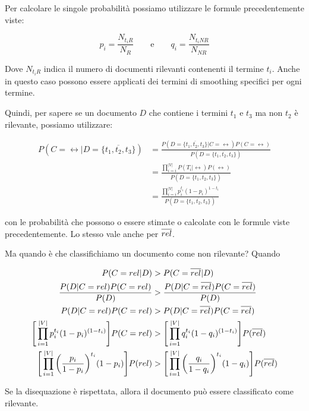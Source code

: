 \noindent Per calcolare le singole probabilità possiamo utilizzare le formule precedentemente viste:

$$
\boxed{p_i = \frac{N_{t_iR}}{N_R}} \qquad \text{e} \qquad \boxed{q_i = \frac{N_{t_iNR}}{N_{NR}}}
$$

\noindent Dove $N_{t_iR}$ indica il numero di documenti rilevanti contenenti il termine $t_i$. Anche in questo caso possono essere applicati dei termini di smoothing specifici per ogni termine.

Quindi, per sapere se un documento $D$ che contiene i termini $t_1$ e $t_3$ ma non $t_2$ è rilevante, possiamo utilizzare:

\begin{align*}
P(C=\rel | D=\{t_1, \overline{t_2}, t_3\}) &=\frac{ P( D=\{t_1, \overline{t_2}, t_3\} |C = \rel)P(C=\rel)}{P( D=\{t_1, \overline{t_2}, t_3\})} \\
                                           &=\frac{\prod\limits_{i=i}^{|V|} P(T_i | \rel)P(\rel) }{P( D=\{t_1, \overline{t_2}, t_3\})} \\
                                           &=\frac{\prod\limits_{i=i}^{|V|}p_{i}^{t_i}(1-p_i)^{1- t_i} }{P( D=\{t_1, \overline{t_2}, t_3\})}
\end{align*}

\noindent con le probabilità che possono o essere stimate o calcolate con le formule viste precedentemente. Lo stesso vale anche per $\overline{rel}$.

Ma quando è che classifichiamo un documento come non rilevante? Quando

\begin{align*}
									                        P(C=rel|D) &> P(C=\overline{rel} |D) \\
									\frac{P(D | C=rel)P(C=rel)}{P(D)} &> \frac{P(D | C=\overline{rel})P(C=\overline{rel})}{P(D)} \\
									             P(D | C=rel)P(C=rel) &> P(D | C=\overline{rel})P(C=\overline{rel}) \\
			\Bigg[\prod\limits_{i=1}^{|V|} p_{i}^{t_i} (1 - p_{i})^{(1-t_i)}\Bigg] P(C = rel) &> \Bigg[\prod\limits_{i=1}^{|V|} q_{i}^{t_i} (1 - q_{i})^{(1-t_i)}\Bigg]P(\overline{rel}) \\
  \Bigg[\prod\limits_{i=1}^{|V|} \bigg(\frac{ p_{i} }{1-p_i}\bigg)^{t_i} (1-p_i)\Bigg] P(rel) &>\Bigg[\prod\limits_{i=1}^{|V|} \bigg(\frac{ q_{i} }{1-q_i}\bigg)^{t_i} (1-q_i)\Bigg] P(\overline{rel})
\end{align*}

\noindent Se la disequazione è rispettata, allora il documento può essere classificato come rilevante.

